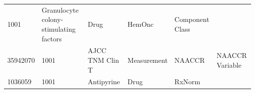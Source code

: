 \documentclass[10.5pt]{book}
\theoremstyle{definition}
\theoremstyle{definition}
\theoremstyle{definition}
\theoremstyle{remark}
\begin{document}
\begin{longtable}[]{@{}llllll@{}}
\begin{minipage}[t]{0.07\columnwidth}
1001\strut
\end{minipage} & \begin{minipage}[t]{0.16\columnwidth}\raggedright\strut
Granulocyte colony-stimulating factors\strut
\end{minipage} & \begin{minipage}[t]{0.14\columnwidth}\raggedright\strut
Drug\strut
\end{minipage} & \begin{minipage}[t]{0.14\columnwidth}\raggedright\strut
HemOnc\strut
\end{minipage} & \begin{minipage}[t]{0.14\columnwidth}\raggedright\strut
Component Class\strut
\end{minipage}\tabularnewline
\begin{minipage}[t]{0.13\columnwidth}\raggedright\strut
35942070\strut
\end{minipage} & \begin{minipage}[t]{0.07\columnwidth}\raggedright\strut
1001\strut
\end{minipage} & \begin{minipage}[t]{0.16\columnwidth}\raggedright\strut
AJCC TNM Clin T\strut
\end{minipage} & \begin{minipage}[t]{0.14\columnwidth}\raggedright\strut
Measurement\strut
\end{minipage} & \begin{minipage}[t]{0.14\columnwidth}\raggedright\strut
NAACCR\strut
\end{minipage} & \begin{minipage}[t]{0.14\columnwidth}\raggedright\strut
NAACCR Variable\strut
\end{minipage}\tabularnewline
\begin{minipage}[t]{0.13\columnwidth}\raggedright\strut
1036059\strut
\end{minipage} & \begin{minipage}[t]{0.07\columnwidth}\raggedright\strut
1001\strut
\end{minipage} & \begin{minipage}[t]{0.16\columnwidth}\raggedright\strut
Antipyrine\strut
\end{minipage} & \begin{minipage}[t]{0.14\columnwidth}\raggedright\strut
Drug\strut
\end{minipage} & \begin{minipage}[t]{0.14\columnwidth}\raggedright\strut
RxNorm\strut
\end{minipage} & \begin{minipage}[t]{0.14\columnwidth}\raggedright\strut

\end{minipage}
\end{longtable}
\end{document}

